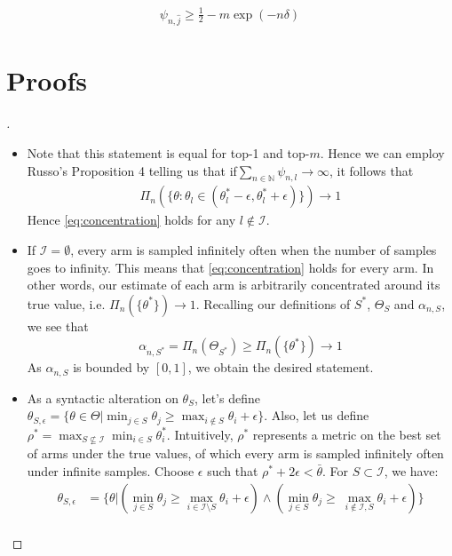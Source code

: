 \begin{lemma}\label{lemma:psi_undersampled}
  \begin{align}
    \psi_{n, \hat{j}} \geq \frac{1}{2} - m\exp(-n \delta)
  \end{align}
\end{lemma}

\section{Proofs}\label{section:txts_proofs}
\begin{proof}[]

  \begin{itemize}
  \item Note that this statement is equal for top-1 and top-$m$. Hence we can employ Russo's Proposition 4 telling us that if$\sum_{n \in \mathbb{N}} \psi_{n, l} \rightarrow \infty$, it follows that
  \begin{align}
    \Pi_n(\{\theta: \theta_l \in (\theta^*_l - \epsilon, \theta^*_l + \epsilon)\}) \rightarrow 1 \label{eq:concentration}
  \end{align}
  Hence \eqref{eq:concentration} holds for any $l \notin \mathcal{I}$.
  \item If $\mathcal{I} = \emptyset$, every arm is sampled infinitely often when the number of samples goes to infinity. This means that \eqref{eq:concentration} holds for every arm. In other words, our estimate of each arm is arbitrarily concentrated around its true value, i.e. $\Pi_n(\{\theta^*\}) \rightarrow 1$. Recalling our definitions of $S^*$, $\Theta_S$ and $\alpha_{n, S}$, we see that
  \[ \alpha_{n, S^*} = \Pi_n(\Theta_{S^*}) \geq \Pi_n(\{\theta^*\}) \rightarrow 1\]
  As $\alpha_{n, S}$ is bounded by $[0, 1]$, we obtain the desired statement.
  \item As a syntactic alteration on $\theta_S$, let's define $\theta_{S, \epsilon} = \{\theta \in \Theta | \min_{j \in S} \theta_j \geq \max_{i \notin S} \theta_i + \epsilon\}$. Also, let us define $\rho^* = \max_{S \not\subseteq \mathcal{I}} \min_{i \in S} \theta^*_i$. Intuitively, $\rho^*$ represents a metric on the best set of arms under the true values, of which every arm is sampled infinitely often under infinite samples.
  Choose $\epsilon$ such that $\rho^* + 2\epsilon < \bar{\theta}$.
  For $S \subset \mathcal{I}$, we have:
  \begin{align}
    \theta_{S, \epsilon} &= \{\theta|(\min_{j \in S} \theta_j \geq \max_{i \in \mathcal{I} \setminus S} \theta_i + \epsilon) \wedge (\min_{j \in S} \theta_j \geq\ \max_{i \notin \mathcal{I}, S} \theta_i + \epsilon)\} \\

\end{align}
\end{itemize}
\end{proof}
